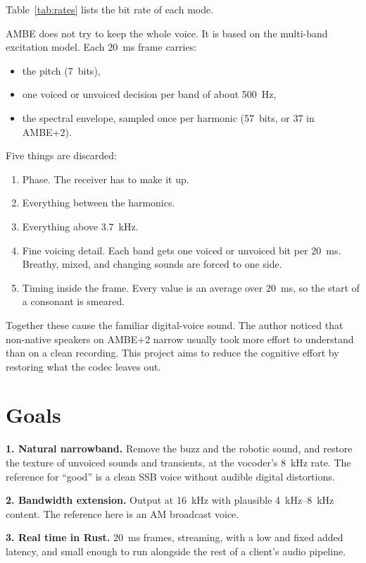 \documentclass[10pt,twocolumn,a4paper]{article}
\begin{document}
Table~\ref{tab:rates} lists the bit rate of each mode.

AMBE does not try to keep the whole voice. It is based on the
multi-band excitation model. Each \SI{20}{ms} frame carries:
\begin{itemize}\itemsep1pt
  \item the pitch (7~bits),
  \item one voiced or unvoiced decision per band of about
    \SI{500}{Hz},
  \item the spectral envelope, sampled once per harmonic (57~bits, or
    37 in AMBE+2).
\end{itemize}

Five things are discarded:

\begin{enumerate}\itemsep2pt
  \item Phase. The receiver has to make it up.
  \item Everything between the harmonics.
  \item Everything above \SI{3.7}{kHz}.
  \item Fine voicing detail. Each band gets one voiced or unvoiced bit
    per \SI{20}{ms}. Breathy, mixed, and changing sounds are forced to
    one side.
  \item Timing inside the frame. Every value is an average over
    \SI{20}{ms}, so the start of a consonant is smeared.
\end{enumerate}

Together these cause the familiar digital-voice sound. The author
noticed that non-native speakers on AMBE+2 narrow usually took more effort to
understand than on a clean recording. This project aims to reduce the cognitive
effort by restoring what the codec leaves out.

\section{Goals}
\label{sec:goals}

\textbf{1. Natural narrowband.} Remove the buzz and the
robotic sound, and restore the texture of unvoiced sounds and transients,
at the vocoder's \SI{8}{kHz} rate.
The reference for ``good'' is a clean SSB voice without audible digital distortions.

\textbf{2. Bandwidth extension.} Output at \SI{16}{kHz} with
plausible \SIrange{4}{8}{kHz} content. The reference here is an AM broadcast
voice.

\textbf{3. Real time in Rust.} \SI{20}{ms} frames,
streaming, with a low and fixed added latency, and small enough to run
alongside the rest of a client's audio pipeline.
\end{document}
